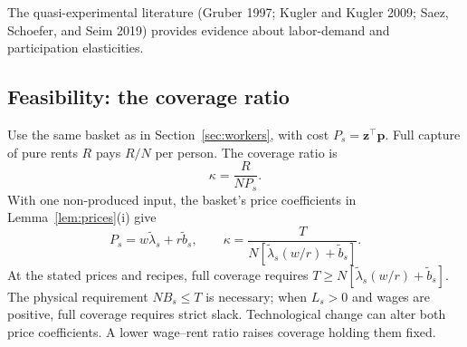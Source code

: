\documentclass[12pt]{article}
\theoremstyle{plain}
\theoremstyle{definition}
\theoremstyle{remark}
\begin{document}
The quasi-experimental literature (Gruber 1997; Kugler and Kugler 2009; Saez, Schoefer, and Seim 2019) provides evidence about labor-demand and participation elasticities.

\subsection{Feasibility: the coverage ratio}\label{app:D.3}

Use the same basket as in Section~\ref{sec:workers}, with cost $P_s=\mathbf{z}^{\top}\mathbf{p}$. Full capture of pure rents $R$ pays $R/N$ per person. The coverage ratio is
\begin{equation}\label{eq:28}
\kappa=\frac{R}{NP_s}.
\end{equation}
With one non-produced input, the basket's price coefficients in Lemma~\ref{lem:prices}(i) give
\[
P_s=w\widetilde\lambda_s+r\widetilde b_s,\qquad
\kappa=\frac{T}{N[\widetilde\lambda_s(w/r)+\widetilde b_s]}.
\]
At the stated prices and recipes, full coverage requires $T\ge N[\widetilde\lambda_s(w/r)+\widetilde b_s]$. The physical requirement $NB_s\le T$ is necessary; when $L_s>0$ and wages are positive, full coverage requires strict slack. Technological change can alter both price coefficients. A lower wage--rent ratio raises coverage holding them fixed.
\end{document}
